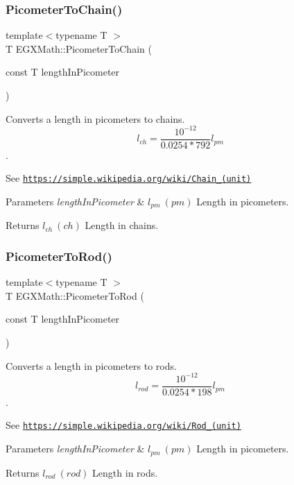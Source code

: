 \subsubsection{\texorpdfstring{Picometer\+To\+Chain()}{PicometerToChain()}}
{\footnotesize\ttfamily template$<$typename T $>$ \\
T E\+G\+X\+Math\+::\+Picometer\+To\+Chain (\begin{DoxyParamCaption}\item[{const T}]{length\+In\+Picometer }\end{DoxyParamCaption})}



Converts a length in picometers to chains. \[ l_{ch}= \frac{10^{-12}}{0.0254 * 792} l_{pm} \]. 

See \href{https://simple.wikipedia.org/wiki/Chain_(unit)}{\tt https\+://simple.\+wikipedia.\+org/wiki/\+Chain\+\_\+(unit)} 
\begin{DoxyParams}{Parameters}
{\em length\+In\+Picometer} & $ l_{pm}\ (pm)$ Length in picometers. \\
\hline
\end{DoxyParams}
\begin{DoxyReturn}{Returns}
$ l_{ch}\ (ch)$ Length in chains. 
\end{DoxyReturn}
\mbox{\label{group___e_g_x_math-_conversions-_length_conversions-_s_i-_picometer-_surveyors_gad6009949eef7a49d34a7fa859ecdf0c6}} 
\subsubsection{\texorpdfstring{Picometer\+To\+Rod()}{PicometerToRod()}}
{\footnotesize\ttfamily template$<$typename T $>$ \\
T E\+G\+X\+Math\+::\+Picometer\+To\+Rod (\begin{DoxyParamCaption}\item[{const T}]{length\+In\+Picometer }\end{DoxyParamCaption})}



Converts a length in picometers to rods. \[ l_{rod}= \frac{10^{-12}}{0.0254 * 198} l_{pm} \]. 

See \href{https://simple.wikipedia.org/wiki/Rod_(unit)}{\tt https\+://simple.\+wikipedia.\+org/wiki/\+Rod\+\_\+(unit)} 
\begin{DoxyParams}{Parameters}
{\em length\+In\+Picometer} & $ l_{pm}\ (pm)$ Length in picometers. \\
\hline
\end{DoxyParams}
\begin{DoxyReturn}{Returns}
$ l_{rod}\ (rod)$ Length in rods. 
\end{DoxyReturn}
